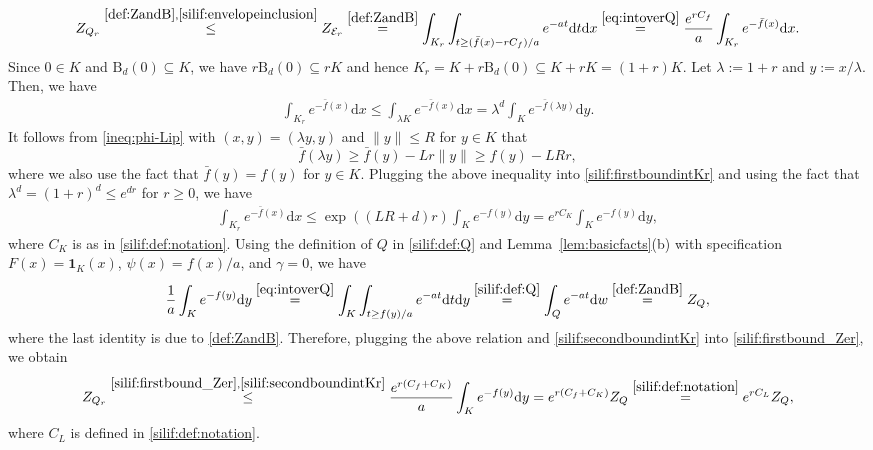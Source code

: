 \documentclass[11pt,letterpaper]{article}
\newcommand{\ball}{\mathrm{B}}
\newcommand{\proj}{\operatorname{proj}}
\newcommand{\lam}{\lambda}
\newcommand{\D}{\mathrm{d}}
\begin{document}
\begin{equation}\label{silif:firstbound_Zer}
    Z_{Q_r}\stackrel{\eqref{def:ZandB},\eqref{silif:envelopeinclusion} }{\le} Z_{\mathcal E_r}\stackrel{\eqref{def:ZandB}}{=}\int_{K_r}\int_{t\ge (\bar f(x)-rC_f)/a} e^{-a t}  \D t  \D x
\stackrel{\eqref{eq:intoverQ}}{=}\frac{e^{rC_f}}{a}\int_{K_r} e^{-\bar f(x)}  \D x. 
\end{equation}
Since $0\in K$ and $\ball_d (0)\subseteq K$, we have $r\ball_d (0)\subseteq rK$ and hence $K_r=K+r\ball_d (0)\subseteq K+rK=(1+r)K$. Let $\lambda:=1+r$ and $y:=x/\lam$. Then, we have
\begin{align}
\label{silif:firstboundintKr}
\int_{K_r} e^{-\bar f(x)}  \D x
\le \int_{\lambda K} e^{-\bar f(x)}  \D x
=\lambda^d\int_{K} e^{-\bar f(\lambda y)}  \D y.
\end{align}
It follows from \eqref{ineq:phi-Lip} with $(x,y)=(\lam y, y)$ and $\|y\|\le R$ for $y\in K$ that 
\[
\bar f(\lambda y) \ge \bar f(y)-L r\|y\|
\ge f(y)-LR  r,
\]
where we also use the fact that $\bar f(y) = f(y)$ for $y \in K$.
Plugging the above inequality into \eqref{silif:firstboundintKr} and using the fact that $\lambda^d=(1+r)^d\le e^{dr}$ for $r\ge 0$, we have
\begin{align}
\label{silif:secondboundintKr}
\int_{K_r} e^{-\bar f(x)}  \D x
\le \exp \left((LR+d)r\right)\int_{K} e^{-f(y)}  \D y
= e^{rC_K}\int_K e^{-f(y)}  \D y,
\end{align}
where $C_K$ is as in \eqref{silif:def:notation}.
Using the definition of $Q$ in \eqref{silif:def:Q} and Lemma~\ref{lem:basicfacts}(b) with specification $F(x)=\mathbf{1}_{K}(x)$, $\psi(x)=f(x)/a$, and $\gamma=0$, we have
\[
\frac{1}{a} \int_K e^{-f(y)} \D y \stackrel{\eqref{eq:intoverQ}}= \int_K \int_{t\ge f(y)/a} e^{-at} \D t  \D y \stackrel{\eqref{silif:def:Q}}= \int_{Q} e^{-a t} \D w \stackrel{\eqref{def:ZandB}}= Z_Q,
\]
where the last identity is due to \eqref{def:ZandB}.
Therefore, plugging the above relation and \eqref{silif:secondboundintKr} into \eqref{silif:firstbound_Zer}, we obtain 
\begin{equation}
\label{silif:lemmafirststep}
Z_{Q_r} \stackrel{\eqref{silif:firstbound_Zer},\eqref{silif:secondboundintKr}}\le \frac{e^{r(C_f+C_K)}}{a} \int_K e^{-f(y)}  \D y
=e^{r(C_f+C_K)}  Z_Q
\stackrel{\eqref{silif:def:notation}}=e^{rC_L}  Z_Q,
\end{equation}
where $C_L$ is defined in \eqref{silif:def:notation}.
\end{document}
